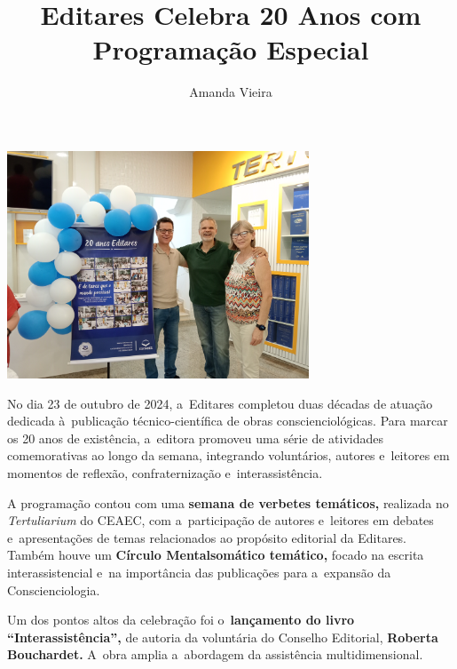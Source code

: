 \documentclass{gescons}
\author{Amanda Vieira}
\title{Editares Celebra 20 Anos com Programação Especial}
\begin{document}
    \makeentrevistatitle


    
    \begin{multicols}{2}


\textbf{}

\noindent\includegraphics[width=9cm]{articles/resumo/fotos/materia1/IMG20241023144802.jpg}


No dia 23 de outubro de 2024, a~Editares completou duas décadas de atuação dedicada à~publicação técnico-científica de obras conscienciológicas. Para marcar os 20 anos de existência, a~editora promoveu uma série de atividades comemorativas ao longo da semana, integrando voluntários, autores e~leitores em momentos de reflexão, confraternização e~interassistência.

A programação contou com uma \textbf{semana de verbetes temáticos,} realizada no \emph{Tertuliarium} do CEAEC, com a~participação de autores e~leitores em debates e~apresentações de temas relacionados ao propósito editorial da Editares. Também houve um \textbf{Círculo Mentalsomático temático,} focado na escrita interassistencial e~na importância das publicações para a~expansão da Conscienciologia.

Um dos pontos altos da celebração foi o~\textbf{lançamento do livro ``Interassistência'',} de autoria da voluntária do Conselho Editorial, \textbf{Roberta Bouchardet.} A~obra amplia a~abordagem da assistência multidimensional.


\end{multicols}
\end{document}
